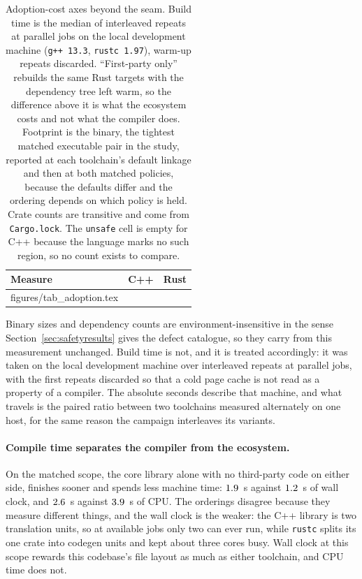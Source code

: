\documentclass[english,oneside,a4paper,censored,csm,software-track-2020]{HYthesisML}
\makeatletter
\newcommand{\gentablebody}[1]{\@@input #1\relax}
\makeatother
\begin{document}
\begin{appendices}
\begin{table}[tp]
\centering
\small
\caption[Adoption-cost axes: build time, static footprint, third-party surface]{Adoption-cost
axes beyond the seam. Build time is the median of \AdoptRepeats{} interleaved repeats at
\AdoptJobs{} parallel jobs on the local development machine (\texttt{g++~13.3},
\texttt{rustc~1.97}), warm-up repeats discarded. ``First-party only'' rebuilds the same Rust
targets with the dependency tree left warm, so the difference above it is what the ecosystem
costs and not what the compiler does. Footprint is the \texttt{\FootTarget} binary, the tightest
matched executable pair in the study, reported at each toolchain's default linkage and then at
both matched policies, because the defaults differ and the ordering depends on which policy is
held. Crate counts are transitive and come from \texttt{Cargo.lock}. The \texttt{unsafe} cell is
empty for C++ because the language marks no such region, so no count exists to
compare.\label{tab:adoption}}
\begin{tabular}{@{}l r r@{}}
\hline\hline
Measure & C++ & Rust \\
\hline
\gentablebody{figures/tab_adoption.tex}\\
\hline
\end{tabular}
\end{table}

Binary sizes and dependency counts are environment-insensitive in the sense
Section~\ref{sec:safetyresults} gives the defect catalogue, so they carry from this measurement
unchanged. Build time is not, and it is treated accordingly: it was taken on the local development
machine over \AdoptRepeats{} interleaved repeats at \AdoptJobs{} parallel jobs, with the first
repeats discarded so that a cold page cache is not read as a property of a compiler. The absolute
seconds describe that machine, and what travels is the paired ratio between two toolchains measured
alternately on one host, for the same reason the campaign interleaves its variants.

\paragraph{Compile time separates the compiler from the ecosystem.}
On the matched scope, the core library alone with no third-party code on either side,
\BuildLibWallFaster{} finishes sooner and \BuildLibCpuCheaper{} spends less machine time:
$1.9$~s against $1.2$~s of wall clock, and $2.6$~s against
$3.9$~s of CPU. The orderings disagree because they measure different things, and
the wall clock is the weaker: the C++ library is two translation units, so at \AdoptJobs{} available
jobs only two can ever run, while \texttt{rustc} splits its one crate into codegen units and kept
about three cores busy. Wall clock at this scope rewards this codebase's file layout as much as
either toolchain, and CPU time does not.


\end{appendices}
\end{document}
